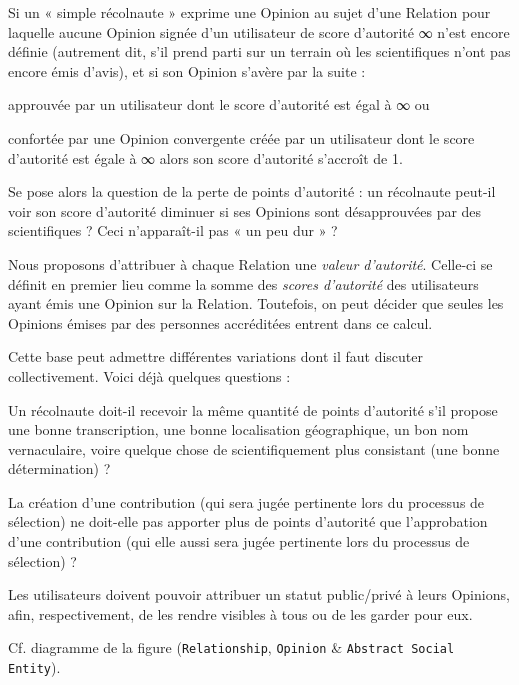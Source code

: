 \leafa{} Si un « simple récolnaute » exprime une Opinion au sujet d'une Relation pour laquelle aucune Opinion signée d'un utilisateur de score d'autorité ∞ n'est encore définie (autrement dit, s'il prend parti sur un terrain où les scientifiques n'ont pas encore émis d'avis), et si son Opinion s'avère par la suite :
\startitemize
	\item approuvée par un utilisateur dont le score d'autorité est égal à ∞ ou
	\item confortée par une Opinion convergente créée par un utilisateur dont le score d'autorité est égale à ∞
\stopitemize
alors son score d'autorité s'accroît de 1.

\bigskip

Se pose alors la question de la perte de points d'autorité : un récolnaute peut-il voir son score d'autorité diminuer si ses Opinions sont désapprouvées par des scientifiques ?
Ceci n'apparaît-il pas « un peu dur » ?

\startsubsection[title={Processus de sélection}]

\idea{} Nous proposons d'attribuer à chaque Relation une {\em valeur d'autorité}.
Celle-ci se définit en premier lieu comme la somme des {\em scores d'autorité} des utilisateurs ayant émis une Opinion sur la Relation.
Toutefois, on peut décider que seules les Opinions émises par des personnes accréditées entrent dans ce calcul.

Cette base peut admettre différentes variations dont il faut discuter collectivement.
Voici déjà quelques questions :

\startitemize
	\item Un récolnaute doit-il recevoir la même quantité de points d'autorité s'il propose une bonne transcription, une bonne localisation géographique, un bon nom vernaculaire, voire quelque chose de scientifiquement plus consistant (une bonne détermination) ?
	\item La création d'une contribution (qui sera jugée pertinente lors du processus de sélection) ne doit-elle pas apporter plus de points d'autorité que l'approbation d'une contribution (qui elle aussi sera jugée pertinente lors du processus de sélection) ?
\stopitemize

\startsubsection[title={Statut des Opinions}]

\fon{} Les utilisateurs doivent pouvoir attribuer un statut public/privé à leurs Opinions, afin, respectivement, de les rendre visibles à tous ou de les garder pour eux.

\startsection[title={Éléments de modélisation}]

Cf. diagramme de la figure  ({\tt Relationship}, {\tt Opinion} & {\tt Abstract Social Entity}).